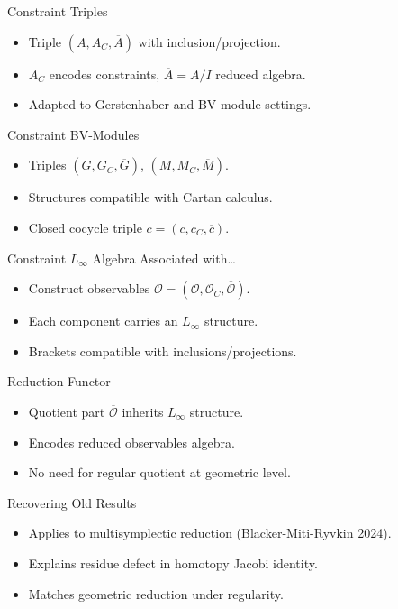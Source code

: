 \documentclass[beamer,10pt,handout]{standalone}  \Handouttrue
\begin{document}
\checkpoint

\begin{frame}{Constraint Triples}
\begin{itemize}
  \item Triple $(A, A_C, \overline{A})$ with inclusion/projection.
  \item $A_C$ encodes constraints, $\overline{A} = A/I$ reduced algebra.
  \item Adapted to Gerstenhaber and BV-module settings.
\end{itemize}
\end{frame}

\begin{frame}{Constraint BV-Modules}
\begin{itemize}
  \item Triples $(G, G_C, \overline{G})$, $(M, M_C, \overline{M})$.
  \item Structures compatible with Cartan calculus.
  \item Closed cocycle triple $c = (c, c_C, \overline{c})$.
\end{itemize}
\end{frame}

\begin{frame}{Constraint $L_\infty$ Algebra Associated with…}
\begin{itemize}
  \item Construct observables $\mathcal{O} = (\mathcal{O}, \mathcal{O}_C, \overline{\mathcal{O}})$.
  \item Each component carries an $L_\infty$ structure.
  \item Brackets compatible with inclusions/projections.
\end{itemize}
\end{frame}

\begin{frame}{Reduction Functor}
\begin{itemize}
  \item Quotient part $\overline{\mathcal{O}}$ inherits $L_\infty$ structure.
  \item Encodes reduced observables algebra.
  \item No need for regular quotient at geometric level.
\end{itemize}
\end{frame}

\begin{frame}{Recovering Old Results}
\begin{itemize}
  \item Applies to multisymplectic reduction (Blacker-Miti-Ryvkin 2024).
  \item Explains residue defect in homotopy Jacobi identity.
  \item Matches geometric reduction under regularity.
\end{itemize}
\end{frame}
\end{document}
